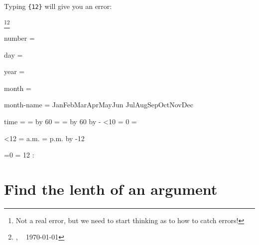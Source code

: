 Typing \texttt{\string\weekday\{12\}} will give you an error: 

  \footnote{Not a real error, but we need to start thinking as to how to catch errors!}\footnote{\jobname, ~ \today }

 \begin{teX}
\def\monthname{%
\ifcase\month
\or Jan\or Feb\or Mar\or Apr\or May\or Jun%
\or Jul\or Aug\or Sep\or Oct\or Nov\or Dec%
\fi}%
\def\timestring{\begingroup
\count0 = \time \divide\count0 by 60
\count2 = \count0 %
\count4 = \time \multiply\count0 by 60
\advance\count4 by -\count0 %
\ifnum\count4<10 \toks1 = {0}%
\else \toks1 = {}%
\fi

\ifnum\count2<12 \toks0 = {a.m.}%
\else \toks0 = {p.m.}%
\advance\count2 by -12
\fi

\ifnum\count2=0 \count2 = 12 \fi 
\number\count2:\the\toks1 \number\count4
\thinspace \the\toks0
\endgroup}%

\def\timestamp{\number\day\space\monthname\space
\number\year\quad\timestring}%

number = \number

day = \day 

year =\year

month = \month

month-name  = \monthname 8

time = \timestring
\end{teX}

\section{Find the lenth of an argument}

